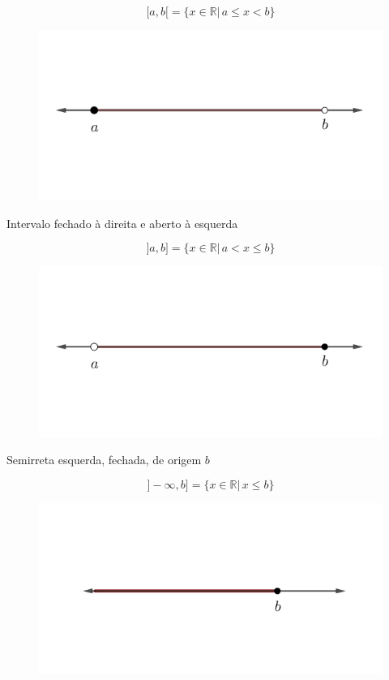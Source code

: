 \begin{itemize}
$$[a,b[ = \{x \in \mathbb{R}|\, a \leq x < b \}$$
\begin{figure}[H]
	\centering
	
	\includegraphics[scale=3.5]{imagens/intervalo-fechado-esquerda.png}

\end{figure}

\begin{center}
	Intervalo fechado à direita e aberto à esquerda
\end{center}

$$]a,b] = \{x \in \mathbb{R}|\, a < x \leq b \}$$
\begin{figure}[H]
	\centering
	
	\includegraphics[scale=3.5]{imagens/intervalo-fechado-direita.png}

\end{figure}

\begin{center}
	Semirreta esquerda, fechada, de origem $b$
\end{center}

$$]-\infty,b] = \{x \in \mathbb{R}|\,  x \leq b \}$$
\begin{figure}[H]
	\centering
	
	\includegraphics[scale=3.5]{imagens/semi-b-esquerda-fechada.png}


\end{figure}
\end{itemize}
